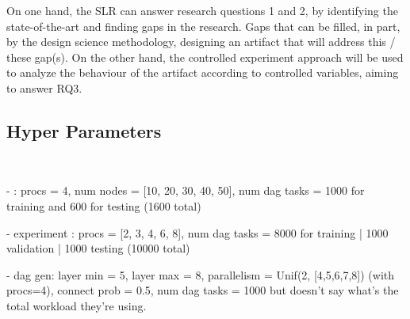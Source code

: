 On one hand, the SLR can answer research questions 1 and 2,
by identifying the state-of-the-art and finding gaps in the research.
Gaps that can be filled, in part, by the design science methodology,
designing an artifact that will address this / these gap(s).
On the other hand, the controlled experiment approach
will be used to analyze the behaviour of the artifact
according to controlled variables, 
aiming to answer RQ3.


\subsection{Hyper Parameters}
~

\begin{list}{}{}
    \item - \citet{Zhao2024GATDRLmodel} : procs = 4, num nodes = [10, 20, 30, 40, 50], num dag tasks = 1000 for training and 600 for testing (1600 total)
    \item - \citet{Lee2021GlobalDagSchedDRL} experiment : procs = [2, 3, 4, 6, 8], num dag tasks = 8000 for training | 1000 validation | 1000 testing (10000 total)
    \item -  \citet{zhao2020DAGsched} dag gen: layer min = 5, layer max = 8, parallelism = Unif(2, [4,5,6,7,8]) (with procs=4), connect prob = 0.5,
                num dag tasks = 1000  but doesn't say what's the total workload they're using. 
\end{list}